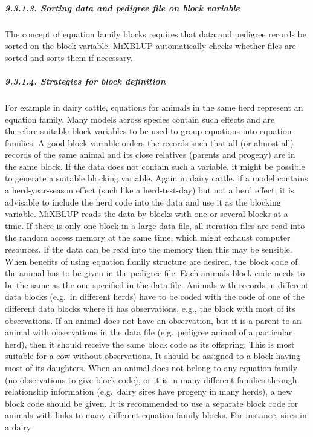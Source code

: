 \subparagraph{9.3.1.3. Sorting data and pedigree file on block
variable}\label{Reli12}

The concept of equation family blocks requires that data and pedigree
records be sorted on the block variable. MiXBLUP automatically checks
whether files are sorted and sorts them if necessary.

\subparagraph{9.3.1.4. Strategies for block definition}\label{Reli13}

For example in dairy cattle, equations for animals in the same herd
represent an equation family. Many models across species contain such
effects and are therefore suitable block variables to be used to group
equations into equation families. A good block variable orders the
records such that all (or almost all) records of the same animal and its
close relatives (parents and progeny) are in the same block. If the data
does not contain such a variable, it might be possible to generate a
suitable blocking variable. Again in dairy cattle, if a model contains a
herd-year-season effect (such like a herd-test-day) but not a herd
effect, it is advisable to include the herd code into the data and use
it as the blocking variable. MiXBLUP reads the data by blocks with one
or several blocks at a time. If there is only one block in a large data
file, all iteration files are read into the random access memory at the
same time, which might exhaust computer resources. If the data can be
read into the memory then this may be sensible. When benefits of using
equation family structure are desired, the block code of the animal has
to be given in the pedigree file. Each animals block code needs to be
the same as the one specified in the data file. Animals with records in
different data blocks (e.g.~in different herds) have to be coded with
the code of one of the different data blocks where it has observations,
e.g., the block with most of its observations. If an animal does not
have an observation, but it is a parent to an animal with observations
in the data file (e.g.~pedigree animal of a particular herd), then it
should receive the same block code as its offspring. This is most
suitable for a cow without observations. It should be assigned to a
block having most of its daughters. When an animal does not belong to
any equation family (no observations to give block code), or it is in
many different families through relationship information (e.g.~dairy
sires have progeny in many herds), a new block code should be given. It
is recommended to use a separate block code for animals with links to
many different equation family blocks. For instance, sires in a dairy
